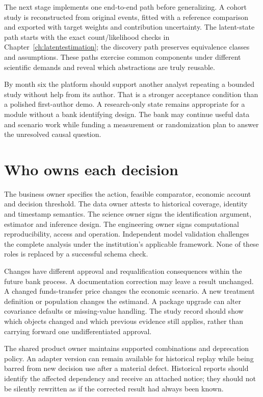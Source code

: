 The next stage implements one end-to-end path before generalizing. A
cohort study is reconstructed from original events, fitted with a reference
comparison and exported with target weights and contribution uncertainty.
The latent-state path starts with the exact count/likelihood checks in
Chapter~\ref{ch:latentestimation}; the discovery path preserves equivalence
classes and assumptions. These paths exercise common components under
different scientific demands and reveal which abstractions are truly reusable.

By month six the platform should support another analyst repeating a
bounded study without help from its author. That is a stronger acceptance
condition than a polished first-author demo. A research-only state remains
appropriate for a module without a bank identifying design. The bank may
continue useful data and scenario work while funding a measurement or
randomization plan to answer the unresolved causal question.

\section{Who owns each decision}
The business owner specifies the action, feasible comparator, economic
account and decision threshold. The data owner attests to historical
coverage, identity and timestamp semantics. The science owner signs the
identification argument, estimator and inference design. The engineering
owner signs computational reproducibility, access and operation. Independent
model validation challenges the complete analysis under the institution's
applicable framework. None of these roles is replaced by a successful
schema check.

Changes have different approval and requalification consequences within
the future bank process. A documentation correction may leave a result
unchanged. A changed funds-transfer price changes the economic scenario.
A new treatment definition or population changes the estimand. A package
upgrade can alter covariance defaults or missing-value handling. The
study record should show which objects changed and which previous evidence
still applies, rather than carrying forward one undifferentiated approval.

The shared product owner maintains supported combinations and deprecation
policy. An adapter version can remain available for historical replay while
being barred from new decision use after a material defect. Historical
reports should identify the affected dependency and receive an attached
notice; they should not be silently rewritten as if the corrected result
had always been known.

